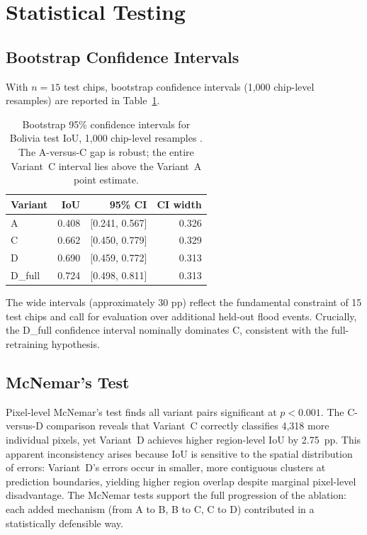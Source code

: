 \documentclass[12pt,oneside]{report}
\begin{document}
\section{Statistical Testing}

\subsection{Bootstrap Confidence Intervals}

With $n = 15$ test chips, bootstrap confidence intervals (1{,}000 chip-level
resamples) are reported in Table~\ref{tab:bootstrap_ci}.

\begin{table}[htbp]
\centering
\caption{Bootstrap 95\% confidence intervals for Bolivia test IoU,
1{,}000 chip-level resamples \cite{efron1993bootstrap}.
The A-versus-C gap is robust; the entire Variant~C interval lies above the
Variant~A point estimate.}
\label{tab:bootstrap_ci}
\begin{tabular}{lrrr}
\toprule
\textbf{Variant} & \textbf{IoU} & \textbf{95\% CI} & \textbf{CI width} \\
\midrule
A       & 0.408 & [0.241, 0.567] & 0.326 \\
C       & 0.662 & [0.450, 0.779] & 0.329 \\
D       & 0.690 & [0.459, 0.772] & 0.313 \\
D\_full & 0.724 & [0.498, 0.811] & 0.313 \\
\bottomrule
\end{tabular}
\end{table}

The wide intervals (approximately 30 pp) reflect the fundamental constraint
of 15 test chips and call for evaluation over additional held-out flood events.
Crucially, the D\_full confidence interval nominally dominates C, consistent
with the full-retraining hypothesis.

\subsection{McNemar's Test}

Pixel-level McNemar's test \cite{mcnemar1947note} finds all variant pairs
significant at $p < 0.001$.
The C-versus-D comparison reveals that Variant~C correctly classifies
4,318 more individual pixels, yet Variant~D achieves higher region-level IoU
by 2.75~pp.
This apparent inconsistency arises because IoU is sensitive to the spatial
distribution of errors: Variant~D's errors occur in smaller, more contiguous
clusters at prediction boundaries, yielding higher region overlap despite
marginal pixel-level disadvantage.
The McNemar tests support the full progression of the ablation: each added
mechanism (from A to B, B to C, C to D) contributed in a statistically
defensible way.
\end{document}
